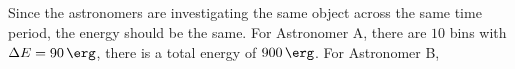 \documentclass{article}
\begin{document}
\subsection{}

\subsection{}

Since the astronomers are investigating the same object across the same time period, the energy should be the same.
For Astronomer A, there are \(10\) bins with \(\Delta E = \SI{90}{\erg}\), there is a total energy of \(\SI{900}{\erg}\).
For Astronomer B,

\subsection{}
\end{document}
